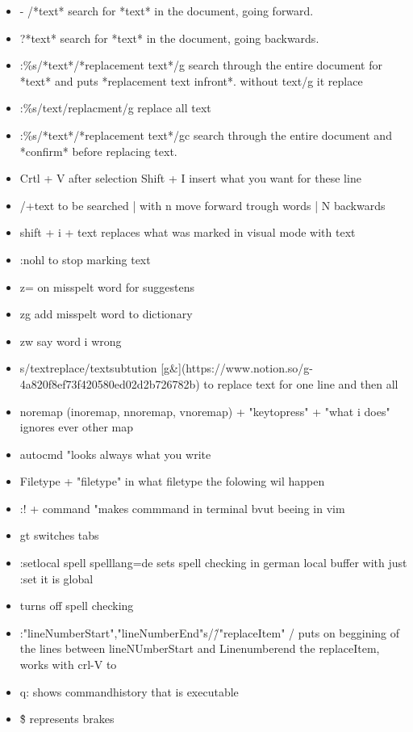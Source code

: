 \documentclass[12pt]{article}
\begin{document}
\begin{itemize}
    \item - /*text* search for *text* in the document, going forward.
    \item ?*text* search for *text* in the document, going backwards.
    \item :\%s/*text*/*replacement text*/g search through the entire document for *text* and puts  *replacement text infront*. without text/g it replace
    \item :\%s/text/replacment/g replace all text
    \item :\%s/*text*/*replacement text*/gc search through the entire document and *confirm* before replacing text.
    \item Crtl + V after selection Shift + I insert what you want for these line
    \item /+text to be searched | with n move forward trough words | N backwards
    \item shift + i + text replaces what was marked in visual mode with text 
    \item :nohl to stop marking text
    \item z= on misspelt word for suggestens
    \item zg add misspelt word to dictionary
    \item zw say word i wrong  
    \item s/textreplace/textsubtution [g\&](https://www.notion.so/g-4a820f8ef73f420580ed02d2b726782b) to replace text for one line and then all
    \item noremap (inoremap, nnoremap, vnoremap) + "keytopress" + "what i does"  ignores ever other map 
    \item autocmd "looks always what you write
    \item Filetype + "filetype"  in what filetype the folowing wil happen
    \item :! + command "makes commmand in terminal bvut beeing in vim
    \item gt switches tabs
    \item :setlocal spell spelllang=de sets spell checking in german local buffer with just :set it is global
    \item <F5> turns off spell checking
    \item :"lineNumberStart","lineNumberEnd"s/\^/"replaceItem" /  puts on beggining of the lines between lineNUmberStart and Linenumberend the replaceItem, works with crl-V to
    \item q: shows commandhistory that is executable
    \item \^\$ represents brakes
\end{itemize}
\end{document}
